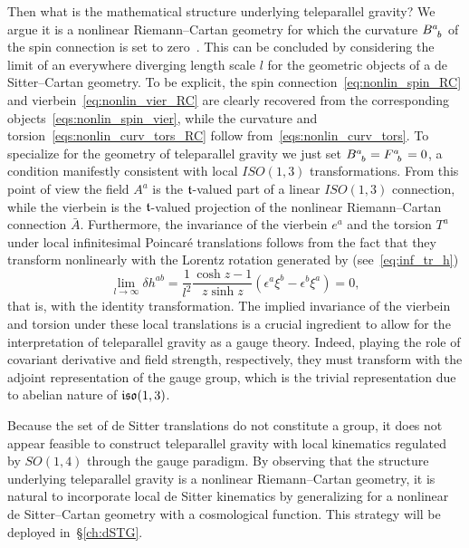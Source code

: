 \documentclass[
final,
11pt,
a4paper,
DIV=11,
headinclude=true,
footinclude=false,
bibliography=totoc,
twoside=true,  %
BCOR=5mm
]{scrbook}
\begin{document}
Then what is the mathematical structure underlying teleparallel 
gravity? We argue it is a nonlinear Riemann--Cartan geometry for 
which the curvature $B\ind{^a_b}$ of the spin connection is set 
to zero~\cite{Jennen:2015bxa}. This can be concluded by 
considering the limit of an everywhere diverging length scale $l$ 
for the geometric objects of a de Sitter--Cartan geometry. To be 
explicit, the spin connection~\eqref{eq:nonlin_spin_RC} and 
vierbein~\eqref{eq:nonlin_vier_RC} are clearly recovered from the 
corresponding objects~\eqref{eqs:nonlin_spin_vier}, while the 
curvature and torsion~\eqref{eqs:nonlin_curv_tors_RC} follow 
from~\eqref{eqs:nonlin_curv_tors}. To specialize for the geometry 
of teleparallel gravity we just set $B\ind{^a_b} = F\ind{^a_b} 
= 0$, a condition manifestly consistent with local $ISO(1,3)$ 
transformations. From this point of view the field $A^a$ is the 
$\mathfrak{t}$-valued part of a linear $ISO(1,3)$ connection, while the 
vierbein is the $\mathfrak{t}$-valued projection of the nonlinear 
Riemann--Cartan connection $\bar{A}$. Furthermore, the invariance 
of the vierbein $e^a$ and the torsion $T^a$ under local 
infinitesimal Poincar\'e translations follows from the fact that 
they transform nonlinearly with the Lorentz rotation generated by 
(see~\eqref{eq:inf_tr_h})
\begin{equation*}
  \lim_{l \to \infty} \delta h^{ab} = \frac{1}{l^2} \frac{\cosh 
    z - 1}{z\sinh z} (\epsilon^a\xi^b - \epsilon^b\xi^a) = 0,
\end{equation*}
that is, with the identity transformation. The implied invariance 
of the vierbein and torsion under these local translations is 
a crucial ingredient to allow for the interpretation of 
teleparallel gravity as a gauge theory. Indeed, playing the role 
of covariant derivative and field strength, respectively, they 
must transform with the adjoint representation of the gauge 
group, which is the trivial representation due to abelian nature 
of $\mathfrak{iso}(1,3)$.

Because the set of de Sitter translations do not constitute 
a group, it does not appear feasible to construct teleparallel 
gravity with local kinematics regulated by $SO(1,4)$ through the 
gauge paradigm. By observing that the structure underlying 
teleparallel gravity is a nonlinear Riemann--Cartan geometry, it 
is natural to incorporate local de Sitter kinematics by 
generalizing for a nonlinear de Sitter--Cartan geometry with 
a cosmological function. This strategy will be deployed 
in~\S\ref{ch:dSTG}.
\end{document}
